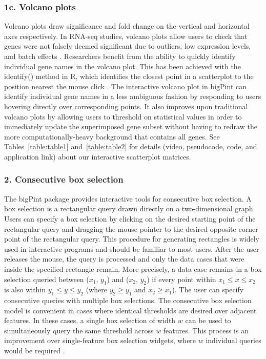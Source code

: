 \documentclass[parskip=full]{bmcart}
\begin{document}
\subsubsection*{1c. Volcano plots}

Volcano plots draw significance and fold change on the vertical and horizontal axes respectively. In RNA-seq studies, volcano plots allow users to check that genes were not falsely deemed significant due to outliers, low expression levels, and batch effects \cite{li2011application}. Researchers benefit from the ability to quickly identify individual gene names in the volcano plot. This has been achieved with the identify() method in R, which identifies the closest point in a scatterplot to the position nearest the mouse click \cite{li2011application}. The interactive volcano plot in bigPint can identify individual gene names in a less ambiguous fashion by responding to users hovering directly over corresponding points. It also improves upon traditional volcano plots by allowing users to threshold on statistical values in order to immediately update the superimposed gene subset without having to redraw the more computationally-heavy background that contains all genes. See Tables~\ref{table:table1} and~\ref{table:table2} for details (video, pseudocode, code, and application link) about our interactive scatterplot matrices.

\subsubsection*{2. Consecutive box selection}

The bigPint package provides interactive tools for consecutive box selection. A box selection is a rectangular query drawn directly on a two-dimensional graph. Users can specify a box selection by clicking on the desired starting point of the rectangular query and dragging the mouse pointer to the desired opposite corner point of the rectangular query. This procedure for generating rectangles is widely used in interactive programs and should be familiar to most users. After the user releases the mouse, the query is processed and only the data cases that were inside the specified rectangle remain. More precisely, a data case remains in a box selection queried between ($x_1$, $y_1$) and ($x_2$, $y_2$) if every point within $x_1 \leq x \leq x_2$ is also within $y_1 \leq y \leq y_2$ (where $y_2 \geq y_1$ and $x_2 \geq x_1$). The user can specify consecutive queries with multiple box selections. The consecutive box selection model is convenient in cases where identical thresholds are desired over adjacent features. In these cases, a single box selection of width $w$ can be used to simultaneously query the same threshold across $w$ features. This process is an improvement over single-feature box selection widgets, where $w$ individual queries would be required \cite{hochheiser2003dynamic}. 
\end{document}
